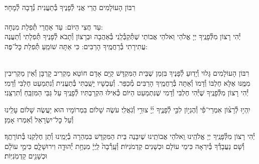 \documentclass[twoside, openany, parskip=half, 11pt]{book}
\begin{document}
\begin{sometimes}

\\
רִבּוֹן הָעוֹלָמִים הֲרֵי אֲנִי לְ֯פָנֶיךָ בְּ֯תַעֲנִית נְ֯דָבָה לְ֯מָחָר׃\\
\\
עַד חֲצִי הַיּוֹם:  עַד אַחֲרֵי תְּ֯פִלַת מִנְחָה:\\
יְ֯הִי רָצוֹן מִלְּ֯פָנֶֽיךָ יְיָ אֱלֹהַי וֵאלֹהֵי אֲבוֹתַי שֶׁתְּ֯קַבְּ֯לֵֽנִי בְּ֯אַהֲבָה וּבְרָצוֹן וְ֯תָבֹא לְ֯פָנֶיךָ תְּ֯פִלָתִי
וְ֯תַעֲנֶה עֲתִירָתִי בְּ֯רַחֲמֶֽיךָ הָרַבִּים: כִּי אַתָּה שׁוֹמֵֽעַ תְּ֯פִלַת כׇּל־פֶּה: 

\sepline

\\
רִבּוֹן הָעוֹלָמִים גָּלוּי וְ֯יָדֽוּעַ לְ֯פָנֶיךָ בִּזְמַן שֶׁבֵּית הַמִּקְדָּשׁ קַיָּם אָדָם חוֹטֵא מַקְרִיב קׇרְבָּן וְ֯אֵין מַקְרִיבִין מִמֶּֽנּוּ אֶלָּא חֶלְבּוֹ וְ֯דָמוֹ וְ֯אַתָּה בְּ֯רַחֲמֶֽיךָ הָרַבִּים מְ֯כַפֵּר. וְ֯עַכְשָׁיו יָשַֽׁבְתִּי בְּ֯תַעֲנִית וְ֯נִתְמַעֵט חֶלְבִּי וְ֯דָמִי׃ יְ֯הִי רָצוֹן מִלְּ֯פָנֶֽיךָ שֶׁיְּ֯הִי חֶלְבִּי וְ֯דָמִי שֶׁנִּתְמַעַט הַיּוֹם כְּ֯אִילּוּ הִקְרַבְתִּיו לְ֯פָנֶֽיךָ עַל גַּבֵּי הַמִּזְבֵּֽחַ וְ֯תִרְצֵֽנִי׃


\end{sometimes}

יִֽהְי֥וּ לְ֯רָצ֨וֹן אִמְרֵי־פִ֡י וְ֯הֶגְי֣וֹן לִבִּ֣י לְ֯פָנֶ֑יךָ יְ֜יָ֗ צוּרִ֥י וְ֯גֹֽאֲלִֽי׃ עֹשֶׂה שָׁלוֹם בִּמְרוֹמָיו הוּא יַעֲשֶׂה שָׁלוֹם עָלֵֽינוּ וְ֯עַל כׇּל־יִשְׂרָאֵל וְ֯אִמְרוּ אָמֵן׃


\begin{small}

יְ֯הִי רָצוֹן מִלְּ֯פָנֶֽיךָ יְיָ אֱלֹהֵֽינוּ וִֵאלֹהֵי אֲבוֹתֵֽינוּ שֶׁיִבָּנֶה בֵּית הַמִּקְדָּשׁ בִּמְהֵרָה בְ֯יָמֵֽינוּ וְ֯תֵן חֶלְקֵֽנוּ בְּ֯תוֹרָתֶֽךָ׃ וְ֯שָׁם נַעֲבָדְ֯ךָ בְּ֯יִרְאָה כִּימֵי עוֹלָם וּכְשָׁנִים קַדְמֹנִיּוֹת׃
וְ֯עָֽרְ֯בָה֙ לַֽיְיָ֔ מִנְחַ֥ת יְ֯הוּדָ֖ה וִירוּשָׁלָ֑םִ כִּימֵ֣י עוֹלָ֔ם וּכְשָׁנִ֖ים קַדְמֹֽנִיּֽוֹת׃


\end{small}



\\
\end{document}

